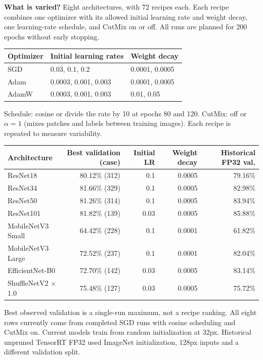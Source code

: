 \documentclass[10pt,a4paper]{article}
\newcommand{\smallcap}[1]{{\footnotesize\color{navy}#1}\par}
\begin{document}
\textbf{What is varied?} Eight architectures, with 72 recipes each. Each recipe combines one optimizer with its allowed initial learning rate and weight decay, one learning-rate schedule, and CutMix on or off. All runs are planned for 200 epochs without early stopping.
\begin{center}\small
\begin{tabular}{@{}lll@{}}\toprule
Optimizer & Initial learning rates & Weight decay\\\midrule
SGD & 0.03, 0.1, 0.2 & 0.0001, 0.0005\\
Adam & 0.0003, 0.001, 0.003 & 0.0001, 0.0005\\
AdamW & 0.0003, 0.001, 0.003 & 0.01, 0.05\\\bottomrule
\end{tabular}
\end{center}
\smallcap{Schedule: cosine or divide the rate by 10 at epochs 80 and 120. CutMix: off or $\alpha=1$ (mixes patches and labels between training images). Each recipe is repeated to measure variability.}

\begin{center}\small
\begin{tabular}{@{}lrrrr@{}}\toprule
Architecture & Best validation (case) & Initial LR & Weight decay & Historical FP32 val.\\
\midrule
ResNet18 & 80.12\% (312) & 0.1 & 0.0005 & 79.16\%\\
ResNet34 & 81.66\% (329) & 0.1 & 0.0005 & 82.98\%\\
ResNet50 & 81.26\% (314) & 0.1 & 0.0005 & 83.94\%\\
ResNet101 & 81.82\% (139) & 0.03 & 0.0005 & 85.88\%\\
MobileNetV3 Small & 64.42\% (228) & 0.1 & 0.0001 & 61.82\%\\
MobileNetV3 Large & 72.52\% (237) & 0.1 & 0.0001 & 82.04\%\\
EfficientNet-B0 & 72.70\% (142) & 0.03 & 0.0005 & 83.14\%\\
ShuffleNetV2 $\times$1.0 & 75.48\% (127) & 0.03 & 0.0005 & 75.72\%\\
\bottomrule\end{tabular}
\end{center}
\smallcap{Best observed validation is a single-run maximum, not a recipe ranking. All eight rows currently come from completed SGD runs with cosine scheduling and CutMix on. Current models train from random initialization at 32px. Historical unpruned TensorRT FP32 used ImageNet initialization, 128px inputs and a different validation split.}
\end{document}
